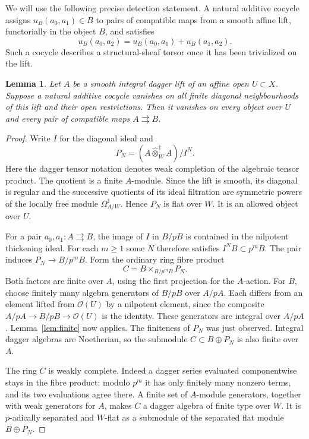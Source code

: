 \documentclass[11pt]{article}
\newcommand{\OO}{\mathcal O}\newcommand{\CC}{\mathcal C}
\newtheorem{lemma}[theorem]{Lemma}\newtheorem{proposition}[theorem]{Proposition}
\theoremstyle{definition}\newtheorem{definition}[theorem]{Definition}
\theoremstyle{remark}\newtheorem{remark}[theorem]{Remark}
\begin{document}
We will use the following precise detection statement. A natural additive cocycle assigns $u_B(a_0,a_1)\in B$ to pairs of compatible maps from a smooth affine lift, functorially in the object $B$, and satisfies
\[
 u_B(a_0,a_2)=u_B(a_0,a_1)+u_B(a_1,a_2).
\]
Such a cocycle describes a structural-sheaf torsor once it has been trivialized on the lift.

\begin{lemma}\label{lem:detect}
Let $A$ be a smooth integral dagger lift of an affine open $U\subset X$. Suppose a natural additive cocycle vanishes on all finite diagonal neighbourhoods of this lift and their open restrictions. Then it vanishes on every object over $U$ and every pair of compatible maps $A\rightrightarrows B$.
\end{lemma}
\begin{proof}
Write $I$ for the diagonal ideal and
\[
 P_N=(A\mathbin{\widehat\otimes^\dagger_W}A)/I^N.
\]
Here the dagger tensor notation denotes weak completion of the algebraic tensor product. The quotient is a finite $A$-module. Since the lift is smooth, its diagonal is regular and the successive quotients of its ideal filtration are symmetric powers of the locally free module $\Omega^1_{A/W}$. Hence $P_N$ is flat over $W$. It is an allowed object over $U$.

For a pair $a_0,a_1:A\rightrightarrows B$, the image of $I$ in $B/pB$ is contained in the nilpotent thickening ideal. For each $m\geq1$ some $N$ therefore satisfies $I^N B\subset p^mB$. The pair induces $P_N\to B/p^mB$. Form the ordinary ring fibre product
\[
 C=B\times_{B/p^mB}P_N.
\]
Both factors are finite over $A$, using the first projection for the $A$-action. For $B$, choose finitely many algebra generators of $B/pB$ over $A/pA$. Each differs from an element lifted from $\OO(U)$ by a nilpotent element, since the composite $A/pA\to B/pB\to\OO(U)$ is the identity. These generators are integral over $A/pA$. Lemma~\ref{lem:finite} now applies. The finiteness of $P_N$ was just observed. Integral dagger algebras are Noetherian, so the submodule $C\subset B\oplus P_N$ is also finite over $A$.

The ring $C$ is weakly complete. Indeed a dagger series evaluated componentwise stays in the fibre product: modulo $p^m$ it has only finitely many nonzero terms, and its two evaluations agree there. A finite set of $A$-module generators, together with weak generators for $A$, makes $C$ a dagger algebra of finite type over $W$. It is $p$-adically separated and $W$-flat as a submodule of the separated flat module $B\oplus P_N$.


\end{proof}
\end{document}
